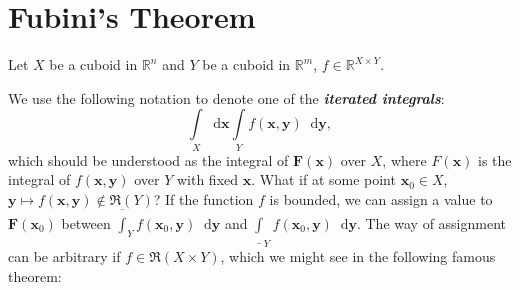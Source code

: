 \documentclass[openany]{book}
\theoremstyle{plain}
\theoremstyle{definition}
\newcommand{\dif}{\mathop{}\!\mathrm{d}} %
\newcommand*{\bv}{\boldsymbol} %
\newcommand{\emphbf}[1]{\emph{\textbf{#1}}}
\begin{document}
\section{Fubini's Theorem}

Let $X$ be a cuboid in $\mathbb R^n$ and $Y$ be a cuboid in $\mathbb R^m$, $f \in \mathbb R^{X \times Y}$. 

We use the following notation to denote one of the \emphbf{iterated integrals}:
\begin{equation*}
	\int\limits_X \dif \bv x \int\limits_Y  f(\bv x, \bv y)  \dif \bv y, 
\end{equation*}
which should be understood as the integral of $\bv F(\bv x)$ over $X$, where $F(\bv x)$ is the integral of $f(\bv x, \bv y)$ over $Y$ with fixed $\bv x$. 
What if at some point $\bv x_0 \in X$, $\bv y \mapsto f(\bv x, \bv y) \notin \mathfrak R(Y)$? 
If the function $f$ is bounded, we can assign a value to $\bv F(\bv x_0)$ between $\overline{\int}_Y f(\bv x_0, \bv y) \dif \bv y$ and $\underline{\int}_Y f(\bv x_0, \bv y) \dif \bv y$. 
The way of assignment can be arbitrary if $f \in \mathfrak R(X \times Y)$, which we might see in the following famous theorem:
\end{document}
